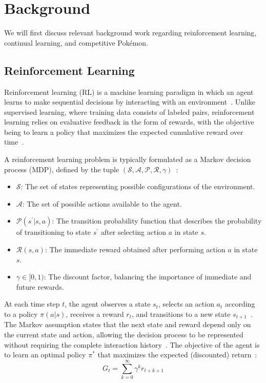%
%
\chapter{Background} \label{sec:background}
We will first discuss relevant background work regarding reinforcement learning, continual learning, and competitive Pokémon.

\section{Reinforcement Learning} \label{sec:rl}
Reinforcement learning (RL) is a machine learning paradigm in which an agent learns to make sequential decisions by interacting with an environment~\cite{sutton2018rl,sutton1992rl,sutton1999rl}.
Unlike supervised learning, where training data consists of labeled pairs, reinforcement learning relies on evaluative feedback in the form of rewards, with the objective being to learn a policy that maximizes the expected cumulative reward over time~\cite{sutton2018rl,sutton1999rl,wang2024drl}.

A reinforcement learning problem is typically formulated as a Markov decision process (MDP), defined by the tuple $(\mathcal{S}, \mathcal{A}, \mathcal{P}, \mathcal{R}, \gamma)$~\cite{khetarpal2022crl,puterman1990mdp}:
\begin{itemize}
    \item $\mathcal{S}$: The set of states representing possible configurations of the environment.
    \item $\mathcal{A}$: The set of possible actions available to the agent.
    \item $\mathcal{P}(s^\prime | s, a)$: The transition probability function that describes the probability of transitioning to state $s^\prime$ after selecting action $a$ in state $s$.
    \item $\mathcal{R}(s, a)$: The immediate reward obtained after performing action $a$ in state $s$.
    \item $\gamma \in [0, 1)$: The discount factor, balancing the importance of immediate and future rewards.
\end{itemize}
At each time step $t$, the agent observes a state $s_t$, selects an action $a_t$ according to a policy $\pi(a|s)$, receives a reward $r_t$, and transitions to a new state $s_{t+1}$~\cite{sutton2018rl}.
The Markov assumption states that the next state and reward depend only on the current state and action, allowing the decision process to be represented without requiring the complete interaction history~\cite{puterman1990mdp}.
The objective of the agent is to learn an optimal policy $\pi^*$ that maximizes the expected (discounted) return~\cite{sutton2018rl,khetarpal2022crl}:
\begin{equation}
    G_t = \sum_{k=0}^{\infty}\gamma^k r_{t+k+1}
\end{equation}

